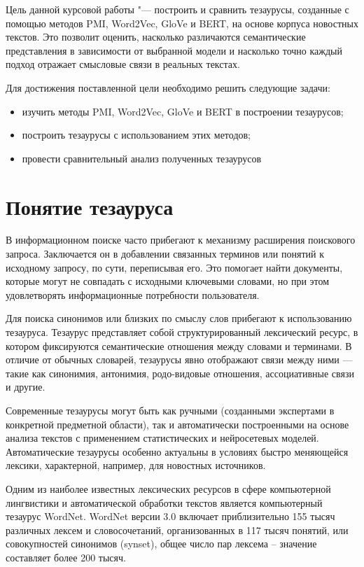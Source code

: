 \documentclass[coursework]{SCWorks}
\begin{document}
Цель данной курсовой работы "--- построить и сравнить тезаурусы, созданные с помощью методов PMI, Word2Vec, GloVe и BERT, на основе корпуса новостных текстов. Это позволит оценить, насколько различаются семантические представления в зависимости от выбранной модели и насколько точно каждый подход отражает смысловые связи в реальных текстах.

Для достижения поставленной цели необходимо решить следующие задачи:
\begin{itemize}
  \item изучить методы PMI, Word2Vec, GloVe и BERT в построении тезаурусов;
  \item построить тезаурусы с использованием этих методов;
  \item провести сравнительный анализ полученных тезаурусов
\end{itemize}

\section{Понятие тезауруса}
В информационном поиске часто прибегают к механизму расширения поискового запроса. Заключается он в добавлении связанных терминов или понятий к исходному запросу, по сути, переписывая его. Это помогает найти документы, которые могут не совпадать с исходными ключевыми словами, но при этом удовлетворять информационные потребности пользователя.

Для поиска синонимов или близких по смыслу слов прибегают к использованию тезауруса. Тезаурус представляет собой структурированный лексический ресурс, в котором фиксируются семантические отношения между словами и терминами. В отличие от обычных словарей, тезаурусы явно отображают связи между ними — такие как синонимия, антонимия, родо-видовые отношения, ассоциативные связи и другие.

Современные тезаурусы могут быть как ручными (созданными экспертами в конкретной предметной области), так и автоматически построенными на основе анализа текстов с применением статистических и нейросетевых моделей. Автоматические тезаурусы особенно актуальны в условиях быстро меняющейся лексики, характерной, например, для новостных источников.

Одним из наиболее известных лексических ресурсов в сфере компьютерной 
лингвистики  и автоматической обработки текстов является компьютерный тезаурус WordNet. WordNet версии 3.0  включает приблизительно 155 тысяч различных лексем и словосочетаний, организованных в 117 тысяч понятий, или совокупностей синонимов (synset), общее число пар лексема – значение составляет более 200 тысяч.
\end{document}
